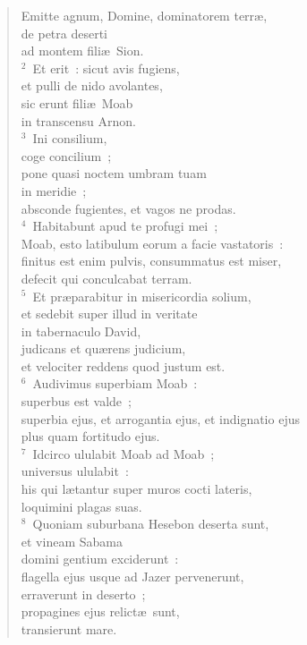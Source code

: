 \begin{flushleft}\begin{verse}\vspace{-19pt}\hspace{6pt}Emitte agnum, Domine, dominatorem terr\ae ,\\\hspace{6pt} de petra deserti\\ ad montem fili\ae\ Sion.\\
${}^{2}$~Et erit~: sicut avis fugiens,\\ et pulli de nido avolantes,\\ sic erunt fili\ae\ Moab\\ in transcensu Arnon.\\
${}^{3}$~Ini consilium,\\ coge concilium~;\\ pone quasi noctem umbram tuam\\ in meridie~;\\ absconde fugientes, et vagos ne prodas.\\
${}^{4}$~Habitabunt apud te profugi mei~;\\ Moab, esto latibulum eorum a facie vastatoris~:\\ finitus est enim pulvis, consummatus est miser,\\ defecit qui conculcabat terram.\\
${}^{5}$~Et pr\ae parabitur in misericordia solium,\\ et sedebit super illud in veritate\\ in tabernaculo David,\\ judicans et qu\ae rens judicium,\\ et velociter reddens quod justum est.\\
${}^{6}$~Audivimus superbiam Moab~:\\ superbus est valde~;\\ superbia ejus, et arrogantia ejus, et indignatio ejus\\ plus quam fortitudo ejus.\\
${}^{7}$~Idcirco ululabit Moab ad Moab~;\\ universus ululabit~:\\ his qui l\ae tantur super muros cocti lateris,\\ loquimini plagas suas.\\
${}^{8}$~Quoniam suburbana Hesebon deserta sunt,\\ et vineam Sabama\\ domini gentium exciderunt~:\\ flagella ejus usque ad Jazer pervenerunt,\\ erraverunt in deserto~;\\ propagines ejus relict\ae\ sunt,\\ transierunt mare.\\

\end{verse}
\end{flushleft}
